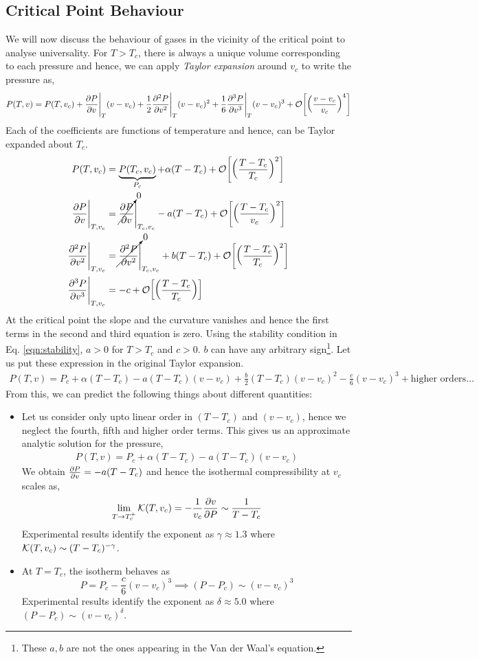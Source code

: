 \subsection{Critical Point Behaviour}
We will now discuss the behaviour of gases in the vicinity of the critical point to analyse universality. For $T>T_c$, there is always a unique volume corresponding to each pressure and hence, we can apply \textit{Taylor expansion} around $v_c$ to write the pressure as,
\begin{align*}
    P(T,v) = P(T,v_c) + \pdv{P}{v}\Bigg|_{T} (v-v_c)+\frac{1}{2}\pdv[2]{P}{v}\Bigg|_{T} (v-v_c)^2+\frac{1}{6}\pdv[3]{P}{v}\Bigg|_{T} (v-v_c)^3+\mathcal O\qty[\qty(\frac{v-v_c}{v_c})^4]
\end{align*}
Each of the coefficients are functions of temperature and hence, can be Taylor expanded about $T_c$. 
\begin{align*}
    P(T,v_c) &= \underbrace{P(T_c,v_c)}_{P_c}+\alpha(T-T_c)+\mathcal O\qty[\qty(\frac{T-T_c}{T_c})^2]\\
    \pdv{P}{v}\Bigg|_{T, v_c}&=\cancelto{0}{\pdv{P}{v}}\Bigg|_{T_c, v_c} -a(T-T_c)+\mathcal O\qty[\qty(\frac{T-T_c}{v_c})^2]\\
     \pdv[2]{P}{v}\Bigg|_{T, v_c}&=\cancelto{0}{\pdv[2]{P}{v}}\Bigg|_{T_c, v_c} +b(T-T_c)+\mathcal O\qty[\qty(\frac{T-T_c}{T_c})^2]\\
     \pdv[3]{P}{v}\Bigg|_{T, v_c}&=-c +\mathcal O\qty[\qty(\frac{T-T_c}{T_c})]
\end{align*}
At the critical point the slope and the curvature vanishes and hence the first terms in the second and third equation is zero. Using the stability condition in Eq. \eqref{eqn:stability}, $a>0$ for $T>T_c$ and $c>0$. $b$ can have any arbitrary sign\footnote{These $a,b$ are not the ones appearing in the Van der Waal's equation.}. Let us put these expression in the original Taylor expansion.
\begin{align}
    P(T,v) =P_c+ \alpha(T-T_c) -a(T-T_c) (v-v_c)+\frac{b}{2}(T-T_c) (v-v_c)^2-\frac{c}{6}(v-v_c)^3+\text{higher orders}\ldots
\end{align}
From this, we can predict the following things about different quantities:
\begin{itemize}
\item Let us consider only upto linear order in $(T-T_c)$ and $(v-v_c)$, hence we neglect the fourth, fifth and higher order terms. This gives us an approximate analytic solution for the pressure,
\begin{align*}
    \boxed{P(T,v) =P_c+ \alpha(T-T_c) -a(T-T_c) (v-v_c)}
\end{align*}
 We obtain $\pdv{P}{v} = -a(T-T_c)$ and hence the isothermal compressibility at $v_c$ scales as, $$\lim\limits_{T\to T_c^+}\mathcal K(T,v_c) = -\frac{1}{v_c}\pdv{v}{P} \sim \frac{1}{T-T_c}$$
 Experimental results identify the exponent as $\gamma\approx 1.3$ where $\mathcal K(T,v_c)\sim (T-T_c)^{-\gamma}$.
 \item At $T=T_c$, the isotherm behaves as $$P=P_c - \frac{c}{6}(v-v_c)^3 \implies (P-P_c)\sim (v-v_c)^3$$
 Experimental results identify the exponent as $\delta\approx 5.0$ where $(P-P_c)\sim (v-v_c)^{\delta}$.
\end{itemize}
